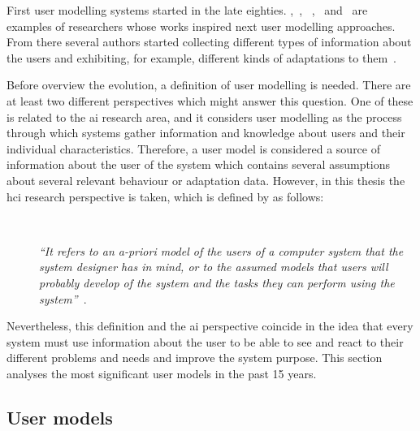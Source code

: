 First user modelling systems started in the late eighties. 
\citet{allen_plan_based_1979},~\citet{cohen_elements_1979}, 
~\citet{perrault_speech_1978},~\citet{rich_building_1979} 
and~\citep{rich_user_1979} are examples of researchers whose works inspired next 
user modelling approaches. From there several authors started collecting 
different types of information about the users and exhibiting, for example, 
different kinds of adaptations to them~\citep{kobsa_generic_2001}.

Before overview the evolution, a definition of user modelling is needed. There 
are at least two different perspectives which might answer this question. One of 
these is related to the \ac{ai} research area, and it considers user modelling 
as the process through which systems gather information and knowledge about 
users and their individual characteristics. Therefore, a user model is considered 
a source of information about the user of the system which contains several
assumptions about several relevant behaviour or adaptation data. However, in
this thesis the \ac{hci} research perspective is taken, which is defined by
\citet{pohl_logic_based_1999} as follows:

\begin{description}
  \item[] \hfill \\
  \begin{mdframed}[hidealllines=true,backgroundcolor=gray!20]
  \textit{``It refers to an a-priori model of the users of a computer system that the system
  designer has in mind, or to the assumed models that users will probably develop
  of the system and the tasks they can perform using the system''}~\citep{pohl_logic_based_1999}.
  \end{mdframed}
\end{description}

Nevertheless, this definition and the \ac{ai} perspective coincide in the idea that 
every system must use information about the user to be able to see and react to 
their different problems and needs and improve the system purpose. This section 
analyses the most significant user models in the past 15 years.

\subsection{User models}
\label{sec:user_models}


















